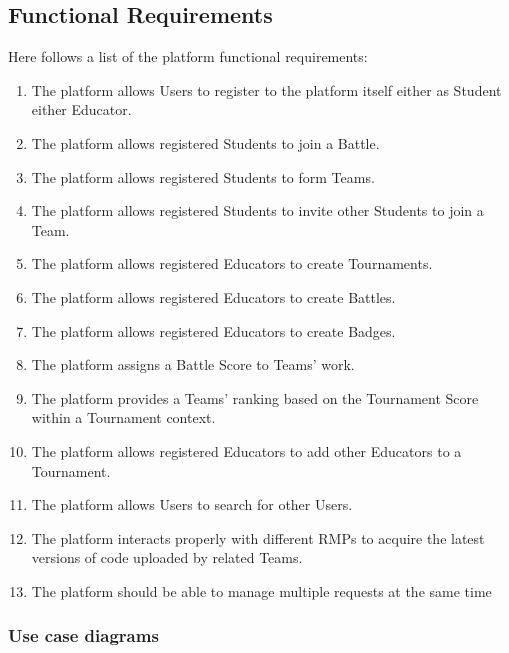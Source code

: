 \subsection{Functional Requirements}
Here follows a list of the platform functional requirements:
\begin{enumerate}[label=$\bullet$ \textbf{R\arabic*:}]
    \item The platform allows Users to register to the platform itself either as Student either Educator.
    \item The platform allows registered Students to join a Battle.
    \item The platform allows registered Students to form Teams.
    \item The platform allows registered Students to invite other Students to join a Team.
    \item The platform allows registered Educators to create Tournaments.
    \item The platform allows registered Educators to create Battles.
    \item The platform allows registered Educators to create Badges.
    \item The platform assigns a Battle Score to Teams' work.
    \item The platform provides a Teams' ranking based on the Tournament Score within a Tournament context.
    \item The platform allows registered Educators to add other Educators to a Tournament.
    \item The platform allows Users to search for other Users.
    \item The platform interacts properly with different RMPs to acquire the latest versions of code uploaded by related Teams. 
    \item The platform should be able to manage multiple requests at the same time
\end{enumerate}

\newpage

\subsubsection{Use case diagrams}

\newpage

